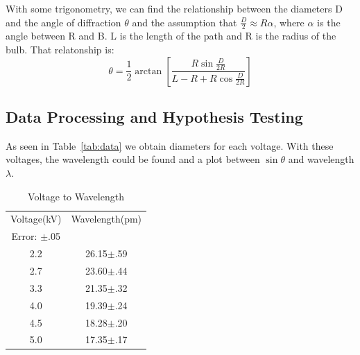 \documentclass[11pt,letterpaper,onecolumn]{article}
\begin{document}
With some trigonometry, we can find the relationship between the diameters D and the angle of diffraction $\theta$ and the assumption that $\frac{D}{2}\approx R\alpha$, where $\alpha$ is the angle between R and B. L is the length of the path and R is the radius of the bulb. That relatonship is:
$$\theta=\frac{1}{2}\arctan{[\frac{R\sin{\frac{D}{2R}}}{L - R + R\cos{\frac{D}{2R}}}]}$$

\subsection{Data Processing and Hypothesis Testing}

As seen in Table~\ref{tab:data} we obtain diameters for each voltage. With these voltages, the wavelength could be found and a plot between $\sin{\theta}$ and wavelength $\lambda$.

\begin{table}[H]
\centering
\begin{tabular}{|c|c|}
 \hline
 Voltage(kV) & Wavelength(pm) \\
 Error: $\pm$.05 &  \\ \hline
 2.2 & 26.15$\pm$.59 \\
 2.7 & 23.60$\pm$.44 \\
 3.3 & 21.35$\pm$.32 \\
 4.0 & 19.39$\pm$.24 \\
 4.5 & 18.28$\pm$.20 \\
 5.0 & 17.35$\pm$.17 \\
 \hline
 
\end{tabular}
\caption{Voltage to Wavelength}
\label{tab:vtl}
\end{table}


\end{document}

